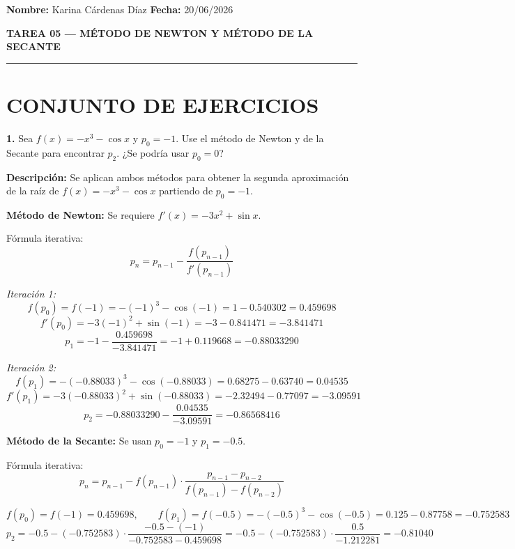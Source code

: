 \documentclass[12pt,a4paper]{article}
\begin{document}
\vspace*{0.3cm}
\textbf{Nombre:} Karina C\'ardenas D\'iaz \hfill \textbf{Fecha:} 20/06/2026

\vspace{0.2cm}
\begin{center}
  \textbf{\large TAREA 05 --- M\'ETODO DE NEWTON Y M\'ETODO DE LA SECANTE}
\end{center}

\hrule
\vspace{0.3cm}

\section*{CONJUNTO DE EJERCICIOS}

\textbf{1.} Sea $f(x) = -x^3 - \cos x$ y $p_0 = -1$. Use el m\'etodo de Newton y de la Secante para encontrar $p_2$. ¿Se podr\'ia usar $p_0 = 0$?

\textbf{Descripci\'on:} Se aplican ambos m\'etodos para obtener la segunda aproximaci\'on de la ra\'iz de $f(x) = -x^3 - \cos x$ partiendo de $p_0 = -1$.

\textbf{M\'etodo de Newton:} Se requiere $f'(x) = -3x^2 + \sin x$.

F\'ormula iterativa:
\[
p_n = p_{n-1} - \frac{f(p_{n-1})}{f'(p_{n-1})}
\]

\textit{Iteraci\'on 1:}
\[
f(p_0) = f(-1) = -(-1)^3 - \cos(-1) = 1 - 0.540302 = 0.459698
\]
\[
f'(p_0) = -3(-1)^2 + \sin(-1) = -3 - 0.841471 = -3.841471
\]
\[
p_1 = -1 - \frac{0.459698}{-3.841471} = -1 + 0.119668 = -0.88033290
\]

\textit{Iteraci\'on 2:}
\[
f(p_1) = -(-0.88033)^3 - \cos(-0.88033) = 0.68275 - 0.63740 = 0.04535
\]
\[
f'(p_1) = -3(-0.88033)^2 + \sin(-0.88033) = -2.32494 - 0.77097 = -3.09591
\]
\[
p_2 = -0.88033290 - \frac{0.04535}{-3.09591} = \boxed{-0.86568416}
\]

\textbf{M\'etodo de la Secante:} Se usan $p_0 = -1$ y $p_1 = -0.5$.

F\'ormula iterativa:
\[
p_n = p_{n-1} - f(p_{n-1})\cdot\frac{p_{n-1} - p_{n-2}}{f(p_{n-1}) - f(p_{n-2})}
\]

\[
f(p_0) = f(-1) = 0.459698, \qquad f(p_1) = f(-0.5) = -(- 0.5)^3 - \cos(-0.5) = 0.125 - 0.87758 = -0.752583
\]
\[
p_2 = -0.5 - (-0.752583)\cdot\frac{-0.5 - (-1)}{-0.752583 - 0.459698}
= -0.5 - (-0.752583)\cdot\frac{0.5}{-1.212281} = \boxed{-0.81040}
\]
\end{document}
